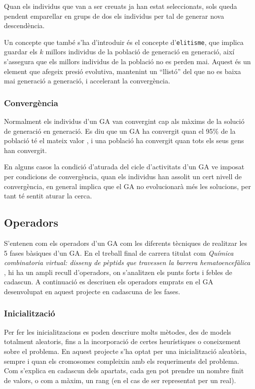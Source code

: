 Quan els individus que van a ser creuats ja han estat seleccionats, sols queda
pendent emparellar en grups de dos els individus per tal de generar nova
descendència. 

Un concepte que també s'ha d'introduir és el concepte d'\texttt{elitisme}, que
implica guardar els $k$ millors individus de la població de generació en
generació, així s'assegura que els millors individus de la població no es perden
mai.  Aquest és un element que afegeix presió evolutiva, mantenint un ``llistó''
del que no es baixa mai generació a generació, i accelerant la convergència.

\subsubsection{Convergència} 

Normalment els individus d'un GA van convergint cap als màxims de la solució de
generació en generació. Es diu que un GA ha convergit quan el 95\% de la
població té el mateix valor \cite{D75}, i una població ha convergit quan tots
els seus gens han convergit.

En alguns casos la condició d'aturada del cicle d'activitats d'un GA ve imposat
per condicions de convergència, quan els individus han assolit un cert nivell de
convergència, en general implica que el GA no evolucionarà més les solucions,
per tant té sentit aturar la cerca.

\subsection{Operadors\label{subsec:operadors}} 

S'entenen com els operadors d'un GA com les diferents tècniques de realitzar les
5 fases bàsiques d'un GA. En el treball final de carrera titulat com
\emph{Química combinatoria virtual: disseny de pèptids que travessen la barrera
hematoencefàlica} \cite{B01},  hi ha un ampli recull d'operadors, on s'analitzen
els punts forts i febles de cadascun.  A continuació es descriuen els operadors
emprats en el GA desenvolupat en aquest projecte en cadascuna de les fases.

\subsubsection{Inicialització} 

Per fer les inicialitzacions es poden descriure molts mètodes, des de models
totalment aleatoris, fins a la incorporació de certes heurístiques o coneixement
sobre el problema. En aquest projecte s'ha optat per una inicialització
aleatòria, sempre i quan els cromosomes compleixin amb els requeriments del
problema.  Com s'explica en cadascun dels apartats, cada gen pot prendre un
nombre finit de valors, o com a màxim, un rang (en el cas de ser representat per
un real).

